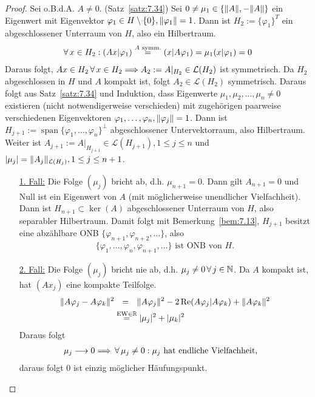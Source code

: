 \begin{proof}
Sei o.B.d.A. $A \neq 0$. (Satz~\ref{satz:7.34}) Sei $0 \neq \mu_1 \in \{\lVert A\rVert, - \lVert A\rVert\}$ ein Eigenwert mit Eigenvektor $\varphi_1 \in H\setminus\{0\}, \lVert \varphi_1\rVert =1$. Dann ist $H_2:=\{\varphi_1\}^T$ ein abgeschlossener Unterraum von $H$, also ein Hilbertraum.
\begin{align*}
\forall \, x \in H_2 : (Ax \vert \varphi_1) \stackrel{\scriptsize A\text{ symm.}}= (x \vert A\varphi_1) = \mu_1 (x \vert \varphi_1) = 0
\end{align*}
Daraus folgt, $Ax \in H_2 \, \forall \, x \in H_2 \Longrightarrow A_2 := A\vert_{H_2} \in \mathcal L(H_2)$ ist symmetrisch. Da $H_2$ abgeschlossen  in $H$ und $A$ kompakt ist, folgt $A_2 \in \mathcal L(H_2)$ symmetrisch. Daraus folgt aus Satz~\ref{satz:7.34} und Induktion, dass Eigenwerte $\mu_1, \mu_2, \ldots , \mu_n \neq 0$ existieren (nicht notwendigerweise verschieden) mit zugehörigen paarweise verschiedenen Eigenvektoren $\varphi_1, \ldots, \varphi_n, \lVert \varphi_j\rVert = 1$. Dann ist $H_{j+1} := \operatorname{span} \{\varphi_1 , \ldots , \varphi_n\}^\perp$ abgeschlossener Untervektorraum, also Hilbertraum. Weiter ist $A_{j+1} := A\vert_{H_{j+1}} \in \mathcal L(H_{j+1}), 1 \leq j \leq n$ und $\lvert \mu_j\rvert = \lVert A_j\rVert_{\mathcal L(H_j)}, 1 \leq j \leq n+1$.
\begin{enumerate}
\item[\underline{1. Fall:}] Die Folge $(\mu_j)$ bricht ab, d.h. $\mu_{n+1} = 0$. Dann gilt $A_{n+1} = 0$ und Null ist ein Eigenwert von $A$ (mit möglicherweise unendlicher Vielfachheit). Dann ist $H_{n+1} \subset \ker (A)$ abgeschlossener Unterraum von $H$, also separabler Hilbertraum. Damit folgt mit Bemerkung~\ref{bem:7.13}, $H_{j+1}$ besitzt eine abzählbare ONB $\{\varphi_{n+1}, \varphi_{n+2}, \ldots \}$, also
\[
	\{\varphi_1, \ldots , \varphi_n, \varphi_{n+1}, \ldots\} \text{ ist ONB von } H .
\]
\item[\underline{2. Fall:}] Die Folge $(\mu_j)$ bricht nie ab, d.h. $\mu_j \neq 0 \, \forall \, j \in \mathbb{N}$. Da $A$ kompakt ist, hat $(Ax_j)$ eine kompakte Teilfolge.
\begin{align*}
	\lVert A\varphi_j - A\varphi_k\rVert^2 & \ \, \,  =\ \, \,  \lVert A\varphi_j\rVert^2 - 2\operatorname{Re} (A\varphi_j\vert A\varphi_k) + \lVert A\varphi_k\rVert^2 \\
	& \stackrel{\scriptsize\text{EW}\in\mathbb{R}}= \lvert \mu_j\rvert^2 + \lvert \mu_k\rvert^2
\end{align*}
Daraus folgt
\begin{align*}
	 & \mu_j \longrightarrow 0 \Longrightarrow \, \forall \, \mu_j \neq 0 : \mu_j \text{ hat endliche Vielfachheit,}
\end{align*}
daraus folgt 0 ist einzig möglicher Häufungspunkt.


\end{enumerate}
\end{proof}

